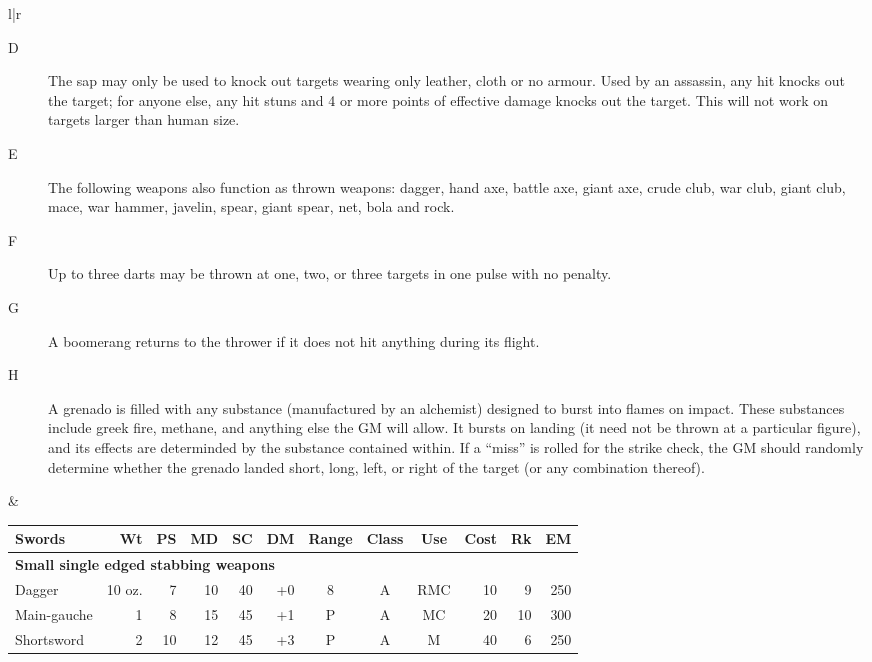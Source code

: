 \begin{tabular}[t]{l|r}
\begin{minipage}[t]{2.0in}
{\begin{description}
\item[D] The sap may only be used to knock out targets wearing only
leather, cloth or no armour.  Used by an assassin, any hit knocks out
the target; for anyone else, any hit stuns and 4 or more points of
effective damage knocks out the target.  This will not work on targets
larger than human size.

\item[E] The following weapons also function as thrown weapons:
dagger, hand axe, battle axe, giant axe, crude club, war club, giant
club, mace, war hammer, javelin, spear, giant spear, net, bola and
rock.

\item[F] Up to three darts may be thrown at one, two, or three targets
in one pulse with no penalty.

\item[G] A boomerang returns to the thrower if it does not hit anything
during its flight.

\item[H] A grenado is filled with any substance (manufactured by an
alchemist) designed to burst into flames on impact.  These substances
include greek fire, methane, and anything else the GM will allow.  It
bursts on landing (it need not be thrown at a particular figure), and
its effects are determinded by the substance contained within.  If a
``miss'' is rolled for the strike check, the GM should randomly
determine whether the grenado landed short, long, left, or right of
the target (or any combination thereof).

\end{description}}
\end{minipage}

&

\begin{minipage}[t]{4.8in}
\renewcommand{\thefootnote}{\Alph{footnote}}
\begin{tabularx}{\linewidth}[t]{Xrrrrrcccrrr}
\textbf{Swords} & \tiny\textbf{Wt} & \tiny\textbf{PS} & \tiny\textbf{MD} & \tiny\textbf{SC} & \tiny\textbf{DM} &
\tiny\textbf{Range} & \tiny\textbf{Class} & \tiny\textbf{Use} & \tiny\textbf{Cost} & \tiny\textbf{Rk} & \tiny\textbf{EM}\\ \hline

\multicolumn{12}{l}{\textbf{Small single edged stabbing weapons}} \\ \hline
Dagger\footnotemark		& 10 oz.& 7	& 10	& 40	& +0	& 8	& A	& RMC	& 10	& 9	& 250 \\ \hline
Main-gauche			& 1	& 8	& 15	& 45	& +1	& P	& A	& MC	& 20	& 10	& 300 \\ \hline
Shortsword			& 2	& 10	& 12	& 45	& +3	& P	& A	& M	& 40	& 6	& 250 \\ \hline


\end{tabularx}
\end{minipage}
\end{tabular}
